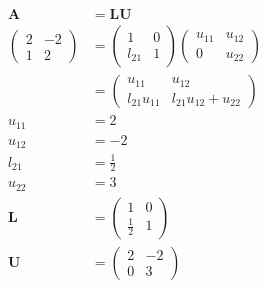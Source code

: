 \documentclass{article}
\begin{document}
\begin{align*}
  \mathbf{A}      & = \mathbf{L U}                           \\
  \begin{pmatrix}
    2 & -2 \\
    1 & 2
  \end{pmatrix} & = \begin{pmatrix}
                      1      & 0 \\
                      l_{21} & 1
                    \end{pmatrix} \begin{pmatrix}
                                    u_{11} & u_{12} \\
                                    0      & u_{22}
                                  \end{pmatrix}            \\
                  & = \begin{pmatrix}
                        u_{11}        & u_{12}                 \\
                        l_{21} u_{11} & l_{21} u_{12} + u_{22}
                      \end{pmatrix} \\
  u_{11}          & = 2                                      \\
  u_{12}          & = -2                                     \\
  l_{21}          & = \frac{1}{2}                            \\
  u_{22}          & = 3                                      \\
  \mathbf{L}      & = \begin{pmatrix}
                        1           & 0 \\
                        \frac{1}{2} & 1
                      \end{pmatrix}                        \\
  \mathbf{U}      & = \begin{pmatrix}
                        2 & -2 \\
                        0 & 3
                      \end{pmatrix}
\end{align*}

\setcounter{subsubsection}{2}
\subsubsection{}
\end{document}
